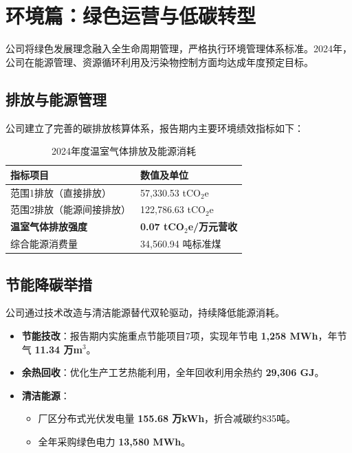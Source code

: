 \documentclass[a4paper,12pt]{article}
\begin{document}
\section{环境篇：绿色运营与低碳转型}

公司将绿色发展理念融入全生命周期管理，严格执行环境管理体系标准。2024年，公司在能源管理、资源循环利用及污染物控制方面均达成年度预定目标。

\subsection{排放与能源管理}
公司建立了完善的碳排放核算体系，报告期内主要环境绩效指标如下：

\begin{table}[h]
\centering
\caption{2024年度温室气体排放及能源消耗}
\renewcommand{\arraystretch}{1.3}
\begin{tabular}{p{} p{}}
\toprule
\textbf{指标项目} & \textbf{数值及单位} \\
\midrule
范围1排放（直接排放） & 57,330.53 tCO$_2$e \\
范围2排放（能源间接排放） & 122,786.63 tCO$_2$e \\
\textbf{温室气体排放强度} & \textbf{0.07 tCO$_2$e/万元营收} \\
综合能源消费量 & 34,560.94 吨标准煤 \\
\bottomrule
\end{tabular}
\end{table}

\subsection{节能降碳举措}
公司通过技术改造与清洁能源替代双轮驱动，持续降低能源消耗。
\begin{itemize}
    \item \textbf{节能技改}：报告期内实施重点节能项目7项，实现年节电 \textbf{1,258 MWh}，年节气 \textbf{11.34 万m$^3$}。
    \item \textbf{余热回收}：优化生产工艺热能利用，全年回收利用余热约 \textbf{29,306 GJ}。
    \item \textbf{清洁能源}：
    \begin{itemize}
        \item 厂区分布式光伏发电量 \textbf{155.68 万kWh}，折合减碳约835吨。
        \item 全年采购绿色电力 \textbf{13,580 MWh}。
    \end{itemize}
\end{itemize}
\end{document}

